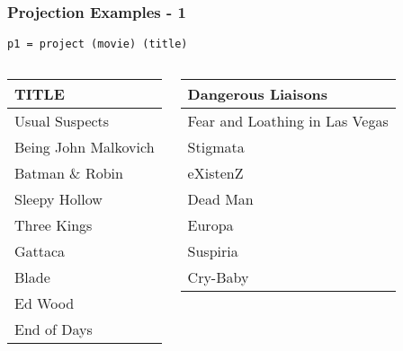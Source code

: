 \documentclass[dvipsnames]{beamer}
\theoremstyle{plain}
\begin{document}
\begin{frame}[fragile]
  \frametitle{Projection Examples - 1}

  \begin{example}
    \begin{lstlisting}
p1 = project (movie) (title)
    \end{lstlisting}

    \pause
    \begin{columns}[b]
      \begin{tiny}
      \begin{table}
        \begin{tabular}{|l|}\hline
TITLE                         \\\hline\hline
Usual Suspects                \\\hline
Being John Malkovich          \\\hline
Batman \& Robin               \\\hline
Sleepy Hollow                 \\\hline
Three Kings                   \\\hline
Gattaca                       \\\hline
Blade                         \\\hline
Ed Wood                       \\\hline
End of Days                   \\\hline
        \end{tabular}
      \end{table}
      \end{tiny}

      \begin{tiny}
      \begin{table}
        \begin{tabular}{|l|}\hline
Dangerous Liaisons            \\\hline
Fear and Loathing in Las Vegas\\\hline
Stigmata                      \\\hline
eXistenZ                      \\\hline
Dead Man                      \\\hline
Europa                        \\\hline
Suspiria                      \\\hline
Cry-Baby                      \\\hline
        \end{tabular}
      \end{table}
      \end{tiny}
    \end{columns}
  \end{example}
\end{frame}
\end{document}
